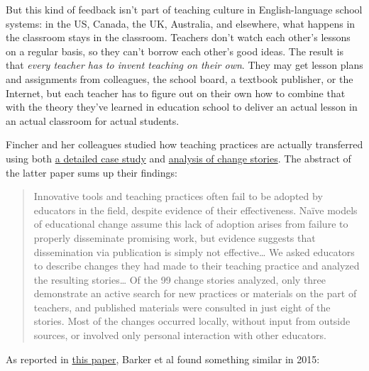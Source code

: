 But this kind of feedback isn't part of teaching culture in English-language school systems:
in the US, Canada, the UK, Australia, and elsewhere,
what happens in the classroom stays in the classroom.
Teachers don't watch each other's lessons on a regular basis,
so they can't borrow each other's good ideas.
The result is that \emph{every teacher has to invent teaching on their own}.
They may get lesson plans and assignments from colleagues,
the school board,
a textbook publisher,
or the Internet,
but each teacher has to figure out on their own how to combine that with
the theory they've learned in education school
to deliver an actual lesson in an actual classroom for actual students.

Fincher and her colleagues studied how teaching practices are actually transferred
using both \href{\{\{ page.root \}\}/files/papers/fincher-warrens-questions-2007.pdf}{a detailed case study}
and
\href{\{\{ page.root \}\}/files/papers/fincher-stories-change-2012.pdf}{analysis of change stories}.
The abstract of the latter paper sums up their findings:

\begin{quote}   %
Innovative tools and teaching practices often fail to be adopted by educators in the field,
despite evidence of their effectiveness.
Naïve models of educational change assume this lack of adoption arises from
failure to properly disseminate promising work,
but evidence suggests that dissemination via publication is simply not effective\ldots{}
We asked educators to describe changes they had made to their teaching practice
and analyzed the resulting stories\ldots{}
Of the 99 change stories analyzed,
only three demonstrate an active search for new practices or materials on the part of teachers,
and published materials were consulted in just eight of the stories.
Most of the changes occurred locally,
without input from outside sources,
or involved only personal interaction with other educators.
\end{quote}   %

As reported in \href{\{\{ page.root \}\}/files/papers/barker-practice-adoption-2015.pdf}{this paper},
Barker et al found something similar in 2015:

